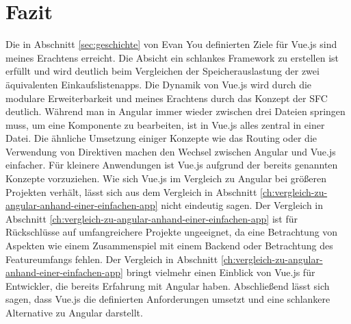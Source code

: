 

\chapter{Fazit}
Die in Abschnitt \ref{sec:geschichte} von Evan You definierten Ziele für Vue.js sind meines Erachtens erreicht.
Die Absicht ein schlankes Framework zu erstellen ist erfüllt und wird deutlich beim Vergleichen der Speicherauslastung
der zwei äquivalenten Einkaufslistenapps.
Die Dynamik von Vue.js wird durch die modulare Erweiterbarkeit und meines Erachtens durch das
Konzept der SFC deutlich.
Während man in Angular immer wieder zwischen drei Dateien springen muss, um eine Komponente zu bearbeiten,
ist in Vue.js alles zentral in einer Datei.
Die ähnliche Umsetzung einiger Konzepte wie das Routing oder die Verwendung von Direktiven machen
den Wechsel zwischen Angular und Vue.js einfacher.
Für kleinere Anwendungen ist Vue.js aufgrund der bereits genannten Konzepte vorzuziehen.
Wie sich Vue.js im Vergleich zu Angular bei größeren Projekten verhält, lässt sich aus dem Vergleich
in Abschnitt \ref{ch:vergleich-zu-angular-anhand-einer-einfachen-app} nicht eindeutig sagen.
Der Vergleich in Abschnitt \ref{ch:vergleich-zu-angular-anhand-einer-einfachen-app} ist für Rückschlüsse
auf umfangreichere Projekte ungeeignet, da eine Betrachtung von Aspekten wie einem Zusammenspiel mit einem Backend
oder Betrachtung des Featureumfangs fehlen.
Der Vergleich in Abschnitt \ref{ch:vergleich-zu-angular-anhand-einer-einfachen-app} bringt vielmehr einen
Einblick von Vue.js für Entwickler, die bereits Erfahrung mit Angular haben.
Abschließend lässt sich sagen, dass Vue.js die definierten
Anforderungen umsetzt und eine schlankere Alternative zu Angular
darstellt.

